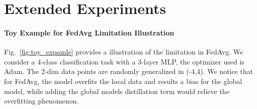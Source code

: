\documentclass{article} %
\begin{document}
\section{Extended Experiments}



\paragraph{Toy Example for FedAvg Limitation Illustration}
Fig.~\ref{fig:toy_expamle} provides a illustration of the limitation in FedAvg. We consider a 4-class classification task with a 3-layer MLP, the optimizer used is Adam. The 2-dim data points are randomly generalized in (-4,4). We notice that for FedAvg, the model overfits the local data and results a bias for the global model, while adding the global models distillation term would relieve the overfitting phenomenon.
\end{document}
